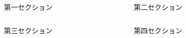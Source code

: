 \begin{frame}[t]{}

\begin{columns}[T]
  \begin{column}{.49\linewidth}
    \begin{block}{第一セクション}
      
    \end{block}
  \end{column}
  \begin{column}{.49\linewidth}
    \begin{block}{第二セクション}
      
    \end{block}
  \end{column}
\end{columns}
\begin{columns}[T]
  \begin{column}{.49\linewidth}
    \begin{block}{第三セクション}
      
    \end{block}
  \end{column}
  \begin{column}{.49\linewidth}
    \begin{block}{第四セクション}
      
    \end{block}
  \end{column}
\end{columns}
\end{frame}
